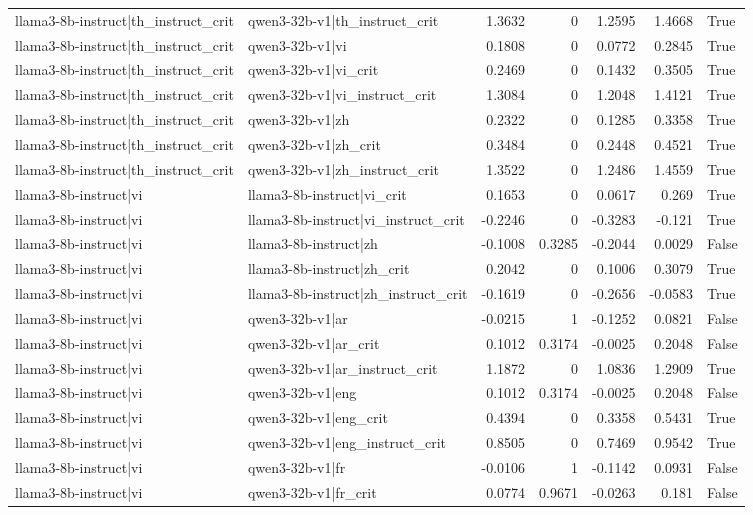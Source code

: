 \begin{table}
\begin{tabular}{l l r r r r l}
llama3-8b-instruct|th_instruct_crit & qwen3-32b-v1|th_instruct_crit & 1.3632 & 0 & 1.2595 & 1.4668 & True \\
llama3-8b-instruct|th_instruct_crit & qwen3-32b-v1|vi & 0.1808 & 0 & 0.0772 & 0.2845 & True \\
llama3-8b-instruct|th_instruct_crit & qwen3-32b-v1|vi_crit & 0.2469 & 0 & 0.1432 & 0.3505 & True \\
llama3-8b-instruct|th_instruct_crit & qwen3-32b-v1|vi_instruct_crit & 1.3084 & 0 & 1.2048 & 1.4121 & True \\
llama3-8b-instruct|th_instruct_crit & qwen3-32b-v1|zh & 0.2322 & 0 & 0.1285 & 0.3358 & True \\
llama3-8b-instruct|th_instruct_crit & qwen3-32b-v1|zh_crit & 0.3484 & 0 & 0.2448 & 0.4521 & True \\
llama3-8b-instruct|th_instruct_crit & qwen3-32b-v1|zh_instruct_crit & 1.3522 & 0 & 1.2486 & 1.4559 & True \\
llama3-8b-instruct|vi & llama3-8b-instruct|vi_crit & 0.1653 & 0 & 0.0617 & 0.269 & True \\
llama3-8b-instruct|vi & llama3-8b-instruct|vi_instruct_crit & -0.2246 & 0 & -0.3283 & -0.121 & True \\
llama3-8b-instruct|vi & llama3-8b-instruct|zh & -0.1008 & 0.3285 & -0.2044 & 0.0029 & False \\
llama3-8b-instruct|vi & llama3-8b-instruct|zh_crit & 0.2042 & 0 & 0.1006 & 0.3079 & True \\
llama3-8b-instruct|vi & llama3-8b-instruct|zh_instruct_crit & -0.1619 & 0 & -0.2656 & -0.0583 & True \\
llama3-8b-instruct|vi & qwen3-32b-v1|ar & -0.0215 & 1 & -0.1252 & 0.0821 & False \\
llama3-8b-instruct|vi & qwen3-32b-v1|ar_crit & 0.1012 & 0.3174 & -0.0025 & 0.2048 & False \\
llama3-8b-instruct|vi & qwen3-32b-v1|ar_instruct_crit & 1.1872 & 0 & 1.0836 & 1.2909 & True \\
llama3-8b-instruct|vi & qwen3-32b-v1|eng & 0.1012 & 0.3174 & -0.0025 & 0.2048 & False \\
llama3-8b-instruct|vi & qwen3-32b-v1|eng_crit & 0.4394 & 0 & 0.3358 & 0.5431 & True \\
llama3-8b-instruct|vi & qwen3-32b-v1|eng_instruct_crit & 0.8505 & 0 & 0.7469 & 0.9542 & True \\
llama3-8b-instruct|vi & qwen3-32b-v1|fr & -0.0106 & 1 & -0.1142 & 0.0931 & False \\
llama3-8b-instruct|vi & qwen3-32b-v1|fr_crit & 0.0774 & 0.9671 & -0.0263 & 0.181 & False \\

\end{tabular}
\end{table}

